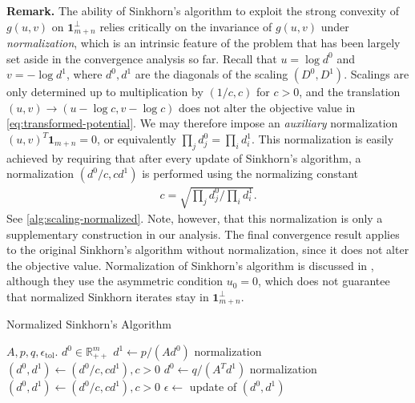 \textbf{Remark.} The ability of Sinkhorn's algorithm to exploit the strong convexity of $g(u,v)$ on $\mathbf{1}_{m+n}^\perp$ relies critically on the invariance of $g(u,v)$ under \emph{normalization}, which is an intrinsic feature of the problem that has been largely set aside in the convergence analysis so far. Recall that $u=\log d^0$ and $v=-\log d^1$, where $d^0,d^1$ are the diagonals of the scaling $(D^0,D^1)$. Scalings are only determined up to multiplication by $(1/c,c)$ for $c>0$, and the translation $(u,v)\rightarrow(u-\log c,v-\log c)$ does not alter the objective value in \eqref{eq:transformed-potential}. We may therefore impose an \emph{auxiliary} normalization $(u,v)^T\mathbf{1}_{m+n}=0$, or equivalently $\prod_j d^0_j = \prod_i d^1_i$. This normalization is easily achieved by requiring that after every update of Sinkhorn's algorithm, a normalization $(d^0/c,c d^1)$ is performed using the normalizing constant 
\begin{align}
\label{eq:normalization}
   c=\sqrt{\prod_j d^0_j /\prod_i d^1_i}.
\end{align}
See \cref{alg:scaling-normalized}. Note, however, that this normalization is only a supplementary construction in our analysis. The final convergence result applies to the original Sinkhorn's algorithm without normalization, since it does not alter the objective value. Normalization of Sinkhorn's algorithm is discussed in \citet{carlier2023sista}, although they use the asymmetric condition $u_0=0$, which does not guarantee that normalized Sinkhorn iterates stay in $\mathbf{1}_{m+n}^\perp$. 
\begin{algorithm}[tb]
\caption{Normalized Sinkhorn's Algorithm}
   \label{alg:scaling-normalized}
\begin{algorithmic}
     $A, p, q,\epsilon_{\text{tol}}$.
    $d^{0}\in\mathbb{R}_{++}^{m}$
   \REPEAT
   \STATE $d^{1} \leftarrow  p/( A d^0)$ 
   \STATE 
  normalization  $(d^0,d^1) \leftarrow (d^0/c,c d^1),c>0$
   \STATE $d^{0}\leftarrow  q/({A}^{T} d^{1})$
   \STATE 
  normalization  $(d^0,d^1) \leftarrow (d^0/c,c d^1),c>0$ 
   \STATE 
$\epsilon\leftarrow$  update of $(d^{0},d^1)$
\end{algorithmic}
\end{algorithm}

